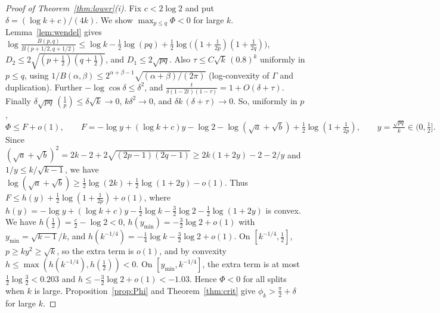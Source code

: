 \documentclass[11pt]{amsart}
\theoremstyle{definition}
\begin{document}
\begin{proof}[Proof of Theorem~\ref{thm:lower}(i)]
Fix $c<2\log2$ and put $\delta=(\log k+c)/(4k)$. We show $\max_{p\le q}\Phi<0$ for large $k$. Lemma~\ref{lem:wendel} gives
$\log\frac{B(p,q)}{B(p+1/2,q+1/2)}\le\log k-\frac12\log(pq)+\frac12\log\big((1+\frac1{2p})(1+\frac1{2q})\big)$,
$D_2\le2\sqrt{(p+\frac12)(q+\frac12)}$, and $D_1\le2\sqrt{pq}$. Also $\tau\le C\sqrt k\,(0.8)^k$ uniformly in $p\le q$, using
$1/B(\alpha,\beta)\le2^{\alpha+\beta-1}\sqrt{(\alpha+\beta)/(2\pi)}$ (log-convexity of $\Gamma$ and duplication). Further
$-\log\cos\delta\le\delta^2$, and $\frac t{\delta(1-2t)(1-\tau)}=1+O(\delta+\tau)$. Finally $\delta\sqrt{pq}\,(\frac1p)\le\delta\sqrt k\to0$,
$k\delta^2\to0$, and $\delta k\,(\delta+\tau)\to0$. So, uniformly in $p$,
\[
\Phi\le F+o(1),\qquad F=-\log y+(\log k+c)y-\log2-\log(\sqrt a+\sqrt b)+\tfrac12\log(1+\tfrac1{2p}),\qquad y=\tfrac{\sqrt{pq}}k\in(0,\tfrac12].
\]
Since $(\sqrt a+\sqrt b)^2=2k-2+2\sqrt{(2p-1)(2q-1)}\ge2k(1+2y)-2-2/y$ and $1/y\le k/\sqrt{k-1}$, we have
$\log(\sqrt a+\sqrt b)\ge\frac12\log(2k)+\frac12\log(1+2y)-o(1)$. Thus $F\le h(y)+\frac12\log(1+\frac1{2p})+o(1)$, where
$h(y)=-\log y+(\log k+c)y-\frac12\log k-\frac32\log2-\frac12\log(1+2y)$ is convex.
We have $h(\frac12)=\frac c2-\log2<0$, $h(y_{\min})=-\frac32\log2+o(1)$ with $y_{\min}=\sqrt{k-1}/k$, and
$h(k^{-1/4})=-\frac14\log k-\frac32\log2+o(1)$. On $[k^{-1/4},\frac12]$, $p\ge ky^2\ge\sqrt k$, so the extra term is $o(1)$, and by convexity
$h\le\max(h(k^{-1/4}),h(\frac12))<0$. On $[y_{\min},k^{-1/4}]$, the extra term is at most $\frac12\log\frac32<0.203$ and
$h\le-\frac32\log2+o(1)<-1.03$. Hence $\Phi<0$ for all splits when $k$ is large. Proposition~\ref{prop:Phi} and Theorem~\ref{thm:crit}
give $\phi_k>\frac\pi2+\delta$ for large $k$.
\end{proof}
\end{document}
